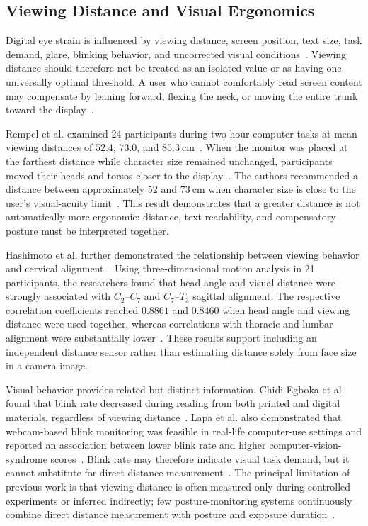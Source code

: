 \subsection{Viewing Distance and Visual Ergonomics}
Digital eye strain is influenced by viewing distance, screen position, text size, task demand, glare, blinking behavior, and uncorrected visual conditions~\cite{ref1,ref11}. Viewing distance should therefore not be treated as an isolated value or as having one universally optimal threshold. A user who cannot comfortably read screen content may compensate by leaning forward, flexing the neck, or moving the entire trunk toward the display~\cite{ref5}.

Rempel et al. examined 24 participants during two-hour computer tasks at mean viewing distances of $52.4$, $73.0$, and $85.3~\text{cm}$~\cite{ref5}. When the monitor was placed at the farthest distance while character size remained unchanged, participants moved their heads and torsos closer to the display~\cite{ref5}. The authors recommended a distance between approximately $52$ and $73~\text{cm}$ when character size is close to the user's visual-acuity limit~\cite{ref5}. This result demonstrates that a greater distance is not automatically more ergonomic: distance, text readability, and compensatory posture must be interpreted together.

Hashimoto et al. further demonstrated the relationship between viewing behavior and cervical alignment~\cite{ref4}. Using three-dimensional motion analysis in 21 participants, the researchers found that head angle and visual distance were strongly associated with $C_2$--$C_7$ and $C_7$--$T_3$ sagittal alignment. The respective correlation coefficients reached $0.8861$ and $0.8460$ when head angle and viewing distance were used together, whereas correlations with thoracic and lumbar alignment were substantially lower~\cite{ref4}. These results support including an independent distance sensor rather than estimating distance solely from face size in a camera image.

Visual behavior provides related but distinct information. Chidi-Egboka et al. found that blink rate decreased during reading from both printed and digital materials, regardless of viewing distance~\cite{ref9}. Lapa et al. also demonstrated that webcam-based blink monitoring was feasible in real-life computer-use settings and reported an association between lower blink rate and higher computer-vision-syndrome scores~\cite{ref10}. Blink rate may therefore indicate visual task demand, but it cannot substitute for direct distance measurement~\cite{ref9,ref10}. The principal limitation of previous work is that viewing distance is often measured only during controlled experiments or inferred indirectly; few posture-monitoring systems continuously combine direct distance measurement with posture and exposure duration~\cite{ref4,ref5,ref17,ref19}.




